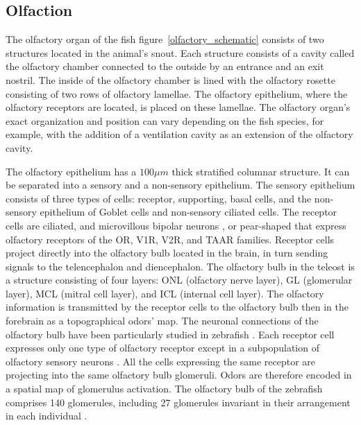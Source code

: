     \subsection{Olfaction}
    The olfactory organ of the fish figure~\ref{olfactory_schematic} consists of two structures located in the animal's snout. Each structure consists of a cavity called the olfactory chamber connected to the outside by an entrance and an exit nostril. The inside of the olfactory chamber is lined with the olfactory rosette consisting of two rows of olfactory lamellae. The olfactory epithelium, where the olfactory receptors are located, is placed on these lamellae. The olfactory organ's exact organization and position can vary depending on the fish species, for example, with the addition of a ventilation cavity as an extension of the olfactory cavity.

    The olfactory epithelium has a $100\mu m$ thick stratified columnar structure. It can be separated into a sensory and a non-sensory epithelium. The sensory epithelium consists of three types of cells: receptor, supporting, basal cells, and the non-sensory epithelium of Goblet cells and non-sensory ciliated cells. The receptor cells are ciliated, and microvillous bipolar neurons \cite{ichikawa1977fine}, or pear-shaped \cite{wakisaka2017adenosine} that express olfactory receptors of the OR, V1R, V2R, and TAAR families. Receptor cells project directly into the olfactory bulb located in the brain, in turn sending signals to the telencephalon and diencephalon. The olfactory bulb in the teleost is a structure consisting of four layers: ONL (olfactory nerve layer), GL (glomerular layer), MCL (mitral cell layer), and ICL (internal cell layer). The olfactory information is transmitted by the receptor cells to the olfactory bulb \cite{nikonov2001electrophysiological
    } then in the forebrain \cite{nikonov2005beyond
    } as a topographical odors' map. The neuronal connections of the olfactory bulb have been particularly studied in zebrafish \cite{hansen1998peripheral
    }. Each receptor cell expresses only one type of olfactory receptor \cite{serizawa2004one,barth1997noncoordinate,weth1996nested,sato2007hierarchical} except in a subpopulation of olfactory sensory neurons \cite{sato2007hierarchical
    }. All the cells expressing the same receptor are projecting into the same olfactory bulb glomeruli. Odors are therefore encoded in a spatial map of glomerulus activation. The olfactory bulb of the zebrafish comprises 140 glomerules, including 27 glomerules invariant in their arrangement in each individual \cite{braubach2012distribution}.

